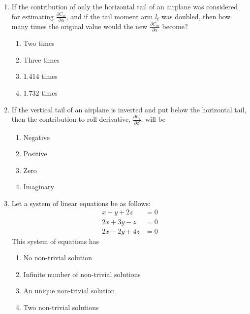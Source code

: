 \documentclass{article}
\begin{document}
\begin{enumerate}
    \item If the contribution of only the horizontal tail of an airplane was considered for estimating $\frac{\partial C_m}{\partial \alpha}$, and if the tail moment arm $l_t$ was doubled, then how many times the original value would the new $\frac{\partial C_m}{\partial \alpha}$ become?
    \begin{multicols}{4}
    \begin{enumerate}
        \item Two times
        \item Three times
        \item 1.414 times
        \item 1.732 times
    \end{enumerate}
    \end{multicols}
        

    \item If the vertical tail of an airplane is inverted and put below the horizontal tail, then the contribution to roll derivative, $\frac{\partial C_l}{\partial \beta}$, will be
    \begin{multicols}{4}
    \begin{enumerate}
        \item Negative
        \item Positive
        \item Zero
        \item Imaginary
    \end{enumerate}
    \end{multicols}
        

    \item Let a system of linear equations be as follows:
    \[
    \begin{aligned}
        x - y + 2z &= 0 \\
        2x + 3y - z &= 0 \\
        2x - 2y + 4z &= 0
    \end{aligned}
    \]
    This system of equations has
    \begin{enumerate}
        \item No non-trivial solution
        \item Infinite number of non-trivial solutions
        \item An unique non-trivial solution
        \item Two non-trivial solutions
    \end{enumerate}
        


\end{enumerate}
\end{document}
